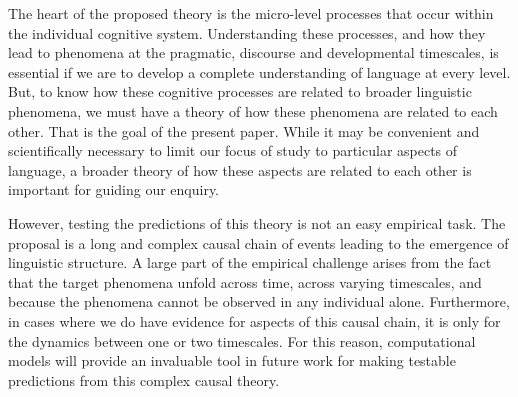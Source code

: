 \documentclass[man, noapacite, 12pt]{apa2}
\begin{document}
The heart of the proposed theory is the micro-level processes that occur within the individual cognitive system. Understanding these processes, and how they lead to phenomena at the pragmatic, discourse and developmental timescales, is essential if we are to develop a complete understanding of language at every level. But, to know how these cognitive processes are related to broader linguistic phenomena, we must have a theory of how these phenomena are related to each other. That is the goal of the present paper. While it may be convenient and scientifically necessary to limit our focus of study to particular aspects of language, a broader theory of how these aspects are related  to each other is important for guiding our  enquiry. 

However, testing the predictions of this theory is not an easy empirical task. The proposal is a long and complex causal chain of events leading to the emergence of linguistic structure. A large part of the empirical challenge arises from the fact that the target phenomena unfold  across time, across varying timescales, and because the phenomena cannot be observed in any individual alone. Furthermore, in cases where we do have evidence for aspects of this causal chain, it is only for the dynamics between one or two timescales. For this reason, computational models will provide an invaluable tool in future work for making testable predictions from this complex causal theory. 


\newpage


\end{document}
